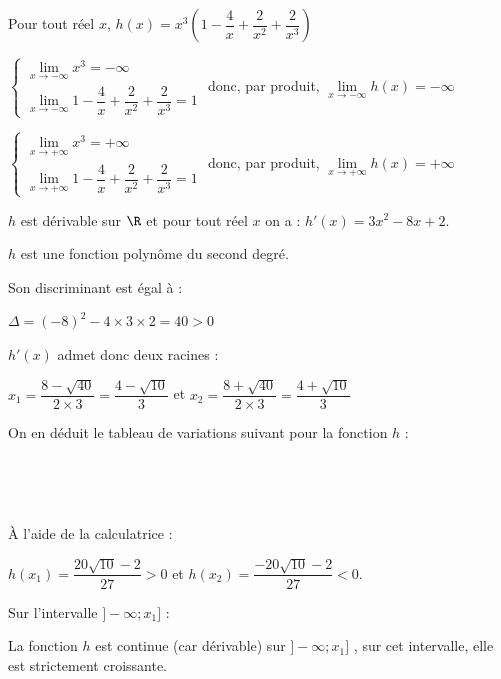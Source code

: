 \begin{enumerate}
		Pour tout réel $x$, $h(x) = x^3 \left(1 - \dfrac{4}{x} + \dfrac{2}{x^2} +\dfrac{2}{x^3}\right)$

		\medskip
		$\begin{cases}
			\lim\limits_{x \to -\infty} x^3 = -\infty \\
			\lim\limits_{x \to -\infty }1 - \dfrac{4}{x} + \dfrac{2}{x^2} +\dfrac{2}{x^3} = 1
		\end{cases}$ donc, par produit, $\lim\limits_{x \to -\infty} h(x) =-\infty$

		\medskip
		$\begin{cases}
			\lim\limits_{x \to +\infty} x^3 = +\infty \\
			\lim\limits_{x \to +\infty }1 - \dfrac{4}{x} + \dfrac{2}{x^2} +\dfrac{2}{x^3} = 1
		\end{cases}$ donc, par produit, $\lim\limits_{x \to +\infty} h(x) =+\infty$

		\bigskip
		$h$ est dérivable sur $\R$ et pour tout réel $x$ on a : \quad $h'(x) = 3x^2 -8x +2$.

		$h$ est une fonction polynôme du second degré.

		Son discriminant est égal à :

		$\Delta = (-8)^2-4 \times 3 \times 2 = 40 >0$

		$h'(x)$  admet donc deux racines :

		\hfill $x_1 = \dfrac { 8 -\sqrt{40}}{2 \times3} = \dfrac{4- \sqrt{10}}{3}$ \hfill et \hfill  $x_2 = \dfrac { 8 +\sqrt{40}}{2 \times3} = \dfrac{4+ \sqrt{10}}{3}$\hfill~

		On en déduit le tableau de variations suivant pour la fonction $h$ :

		\hfill~
		\hfill~

		À l'aide de la calculatrice :

		\quad $h(x_1) = \dfrac{20\sqrt{10}-2}{27}   >0$  \quad et \quad $h(x_2) =\dfrac{-20\sqrt{10}-2}{27}  <0$.

		\bigskip

		Sur l'intervalle $]-\infty ; x_1]$ :

		La fonction $h$ est continue (car dérivable) sur $]-\infty ; x_1]$ , sur cet intervalle, elle est strictement croissante.


\end{enumerate}
